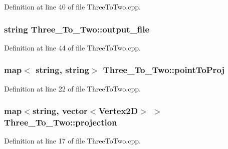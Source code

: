 Definition at line 40 of file Three\+To\+Two.\+cpp.

\subsubsection[{\texorpdfstring{output\+\_\+file}{output_file}}]{\setlength{\rightskip}{0pt plus 5cm}string Three\+\_\+\+To\+\_\+\+Two\+::output\+\_\+file}\hypertarget{class_three___to___two_a94c401d2acc198ffb188d37e7ce424c4}{}\label{class_three___to___two_a94c401d2acc198ffb188d37e7ce424c4}


Definition at line 44 of file Three\+To\+Two.\+cpp.

\subsubsection[{\texorpdfstring{point\+To\+Proj}{pointToProj}}]{\setlength{\rightskip}{0pt plus 5cm}map$<$ string, string$>$ Three\+\_\+\+To\+\_\+\+Two\+::point\+To\+Proj}\hypertarget{class_three___to___two_a10db4a5f7a04743b00ce1f9215147dcc}{}\label{class_three___to___two_a10db4a5f7a04743b00ce1f9215147dcc}


Definition at line 22 of file Three\+To\+Two.\+cpp.

\subsubsection[{\texorpdfstring{projection}{projection}}]{\setlength{\rightskip}{0pt plus 5cm}map$<$string, vector$<${\bf Vertex2D}$>$ $>$ Three\+\_\+\+To\+\_\+\+Two\+::projection}\hypertarget{class_three___to___two_a39ed690740565f107b2b65a678e0ab5e}{}\label{class_three___to___two_a39ed690740565f107b2b65a678e0ab5e}


Definition at line 17 of file Three\+To\+Two.\+cpp.

